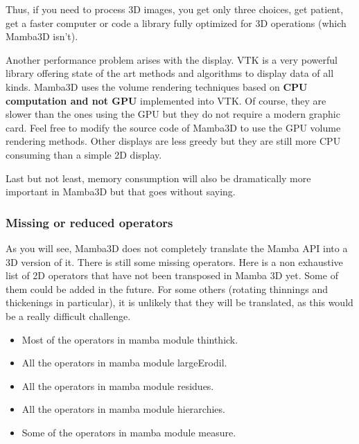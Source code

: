 \documentclass[a4paper,10pt,oneside]{article}
\begin{document}
Thus, if you need to process 3D images, you get only three choices, get patient, 
get a faster computer or code a library fully optimized for 3D operations 
(which Mamba3D isn't).

Another performance problem arises with the display. VTK is a very powerful
library offering state of the art methods and algorithms to display 
data of all kinds. Mamba3D uses the volume rendering techniques based on 
\textbf{CPU computation and not GPU} implemented into VTK. Of course, they
are slower than the ones using the GPU but they do not require a modern
graphic card. Feel free to modify the source code of Mamba3D to use the
GPU volume rendering methods. Other displays are less greedy but they
are still more CPU consuming than a simple 2D display.


Last but not least, memory consumption will also be dramatically more important
in Mamba3D but that goes without saying.

\subsubsection{Missing or reduced operators}
\label{cha:missing3D}

As you will see, Mamba3D does not completely translate the Mamba API into
a 3D version of it. There is still some missing operators. Here is a non
exhaustive list of 2D operators that have not been transposed in Mamba 3D yet.
Some of them could be added in the future. For some others (rotating thinnings
and thickenings in particular), it is unlikely that they will be translated, as
this would be a really difficult challenge.

\begin{itemize}
\item Most of the operators in mamba module thinthick.
\item All the operators in mamba module largeErodil.
\item All the operators in mamba module residues.
\item All the operators in mamba module hierarchies.
\item Some of the operators in mamba module measure.
\end{itemize}
\end{document}
